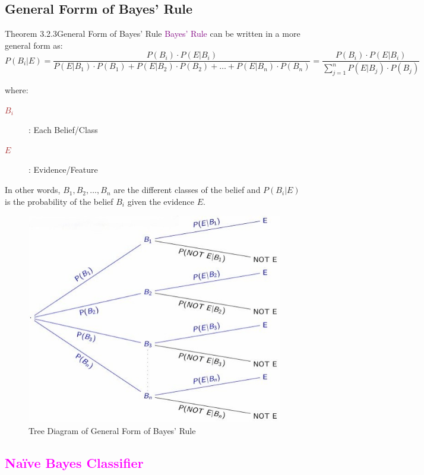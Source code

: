 \documentclass{book}
\begin{document}
\subsection{General Forrm of Bayes' Rule}
\begin{thmBox}{Theorem 3.2.3}{General Form of Bayes' Rule}
    \textcolor{purple}{Bayes' Rule} can be written in a more general form as:
    \[
        P(B_i|E) = \frac{P(B_i) \cdot P(E|B_i)}{P(E|B_1) \cdot P(B_1) + P(E|B_2) \cdot P(B_2) + \ldots + P(E|B_n) \cdot P(B_n)}
        = \frac{P(B_i) \cdot P(E|B_i)}{\sum_{j=1}^{n} P(E|B_j) \cdot P(B_j)}
    \]
    \raggedright
    where:
    \begin{description}
        \item[\textcolor{brown}{\(B_i\)}]: Each Belief/Class
        \item[\textcolor{brown}{\(E\)}]: Evidence/Feature
    \end{description}
\end{thmBox}
In other words, \(B_1, B_2, \ldots, B_n\) are the different classes of the belief and \(P(B_i|E)\) is the probability of the belief \(B_i\) given the evidence \(E\).
\begin{figure}[h]
    \centering
    \includegraphics[scale=0.7]{chapter 3/ch3_figure4.jpeg}
    \caption{Tree Diagram of General Form of Bayes' Rule}
\end{figure}
\newpage
\textcolor{magenta}{\section{\textbf{Naïve Bayes Classifier}}}
\end{document}
